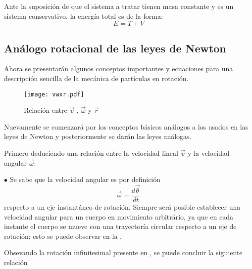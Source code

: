 \documentclass[/home/hernan-barquero/Documents/Apuntes_mecanica_teorica/main.tex]{subfiles}
\begin{document}
	\begin{definition}
		Ante la suposición de que el sistema a tratar tienen masa constante y es un sistema conservativo, la energía total es de la forma:
		\begin{equation}
			E = T + V
			\label{eq: Energy}
		\end{equation}
		
	\end{definition}

	\subsection{Análogo rotacional de las leyes de Newton}

	Ahora se presentarán algunos conceptos importantes y ecuaciones para una descripción sencilla de la mecánica de partículas en rotación. 	
	\begin{marginfigure}
		\begin{figure}[H]
			\texttt{[image: vwxr.pdf]}
			\caption{Relación entre $\vec{v}$ , $\vec{\omega}$ y $\vec{r}$}
			\label{fig: vwxr}
		\end{figure}
	\end{marginfigure}
	Nuevamente se comenzará por los conceptos básicos análogos a los usados en las leyes de Newton y posteriormente se darán las leyes análogas.



	Primero deduciendo una relación entre la velocidad lineal $\vec{v}$ y la velocidad angular $\vec{\omega}$:

	$\bullet$ Se sabe que la velocidad angular es por definición
	\begin{equation}
		\vec{\omega}= \frac{d \vec{\theta}}{dt}
	\end{equation}
	respecto a un eje instantáneo de rotación. Siempre será posible establecer una velocidad angular para un cuerpo en movimiento arbitrário, ya que en cada instante el cuerpo se mueve con una trayectoría circular respecto a un eje de rotación; esto se puede observar en la .


	Obsevando la rotación infinitesimal presente en , se puede concluir la siguiente relación 
	
\end{document}
